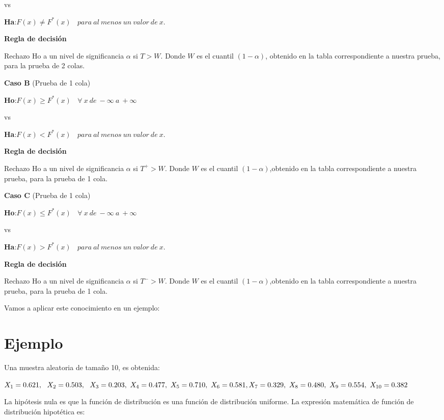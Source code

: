 \documentclass[a4paper,oneside,openany]{book}
\begin{document}
vs

\textbf{Ha}:\(F(x) \neq F^*(x) \ \ \ \ para\ al\ menos\ un\  valor\ de\  x.\)

\textbf{Regla de decisión}

Rechazo Ho a un nivel de significancia \(\alpha\) si \(T>W\). Donde
\(W\) es el cuantil \((1-\alpha)\), obtenido en la tabla correspondiente
a nuestra prueba, para la prueba de 2 colas.

\textbf{Caso B} (Prueba de 1 cola)

\textbf{Ho}:\(F(x) \geq F^*(x) \ \ \ \ \forall\ x\  de\ -\infty \ a\  +\infty\)

vs

\textbf{Ha}:\(F(x) < F^*(x) \ \ \ \ para\ al\ menos\ un\  valor\ de\  x.\)

\textbf{Regla de decisión}

Rechazo Ho a un nivel de significancia \(\alpha\) si \(T^+>W\). Donde
\(W\) es el cuantil \((1-\alpha)\),obtenido en la tabla correspondiente
a nuestra prueba, para la prueba de 1 cola.

\textbf{Caso C} (Prueba de 1 cola)

\textbf{Ho}:\(F(x) \leq F^*(x) \ \ \ \ \forall\ x\  de\ -\infty \ a\  +\infty\)

vs

\textbf{Ha}:\(F(x) > F^*(x) \ \ \ \ para\ al\ menos\ un\  valor\ de\  x.\)

\textbf{Regla de decisión}

Rechazo Ho a un nivel de significancia \(\alpha\) si \(T^->W\). Donde
\(W\) es el cuantil \((1-\alpha)\),obtenido en la tabla correspondiente
a nuestra prueba, para la prueba de 1 cola.

Vamos a aplicar este conocimiento en un ejemplo:

\section{Ejemplo}\label{ejemplo-11}

Una muestra aleatoria de tamaño 10, es obtenida:

\(X_{1}=0.621,\ \ X_{2}=0.503, \ \ X_{3}=0.203, \ X_{4}=0.477, \ X_{5}=0.710, \ X_{6}=0.581, \\ X_{7}=0.329, \ X_{8}=0.480, \  X_{9}=0.554, \ X_{10}=0.382\)

La hipótesis nula es que la función de distribución es una función de
distribución uniforme. La expresión matemática de función de
distribución hipotética es:
\end{document}

